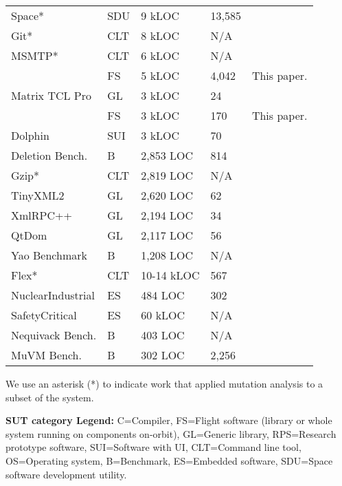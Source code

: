 \begin{table}[h]
{\begin{tabular}{|p{1.6cm}p{1.1cm}p{1cm}p{1cm}p{2.3cm}|}
Space* 						  & SDU & 9 kLOC & 13,585 & \cite{tokumoto2016muvm,papadakis2014mitigating,yao2014study,clark2013semantic}\\
Git* 						  & CLT & 8 kLOC & N/A & \cite{kintis2017detecting,papadakis2015trivial}\\
MSMTP* 						  & CLT & 6 kLOC & N/A & \cite{kintis2017detecting,papadakis2015trivial}\\
\textbf{\MLFS{}} 			  & FS & 5 kLOC & 4,042 & This paper.\\
Matrix TCL Pro 				  & GL &  3 kLOC & 24 & \cite{delgado2017assessment}\\
\textbf{\PARAM{}}  			  & FS & 3 kLOC & 170& This paper.\\
Dolphin 					  & SUI & 3 kLOC & 70 &  \cite{delgado2017assessment}\\
Deletion Bench.  		  & B   & 2,853 LOC & 814 & \cite{delamaro2014designing,delamaro2014experimental}\\
Gzip* 						  & CLT & 2,819 LOC & N/A & \cite{kintis2017detecting,papadakis2015trivial}\\
TinyXML2 					  & GL  & 2,620 LOC & 62 & \cite{delgado2017assessment,delgado2015class}\\
XmlRPC++ 					  & GL  & 2,194 LOC & 34 & \cite{delgado2017assessment,delgado2015class}\\
QtDom 						  & GL  & 2,117 LOC & 56 & \cite{delgado2017assessment}\\
Yao Benchmark  				  & B   & 1,208 LOC & N/A & \cite{yao2014study}\\
Flex* 						  & CLT &  10-14 kLOC & 567 & \cite{papadakis2014mitigating,yao2014study}\\
NuclearIndustrial  			  & ES & 484 LOC & 302 & \cite{delgado2018evaluation}\\
SafetyCritical				  & ES & 60 kLOC & N/A & \cite{Ramler2017}\\ 
Nequivack Bench.  		  & B & 403 LOC & N/A & \cite{holling2016nequivack}\\
MuVM Bench.  			  & B & 302 LOC & 2,256 & \cite{tokumoto2016muvm}\\
\hline                                                    
\end{tabular}
}

We use an asterisk (*) to indicate work that applied mutation analysis to a subset of the system.

\textbf{SUT category Legend:} C=Compiler, 
FS=Flight software (library or whole system running on components on-orbit), 
GL=Generic library, RPS=Research prototype software, SUI=Software with UI, CLT=Command line tool, OS=Operating system, B=Benchmark, ES=Embedded software, SDU=Space software development utility.

\end{table}

